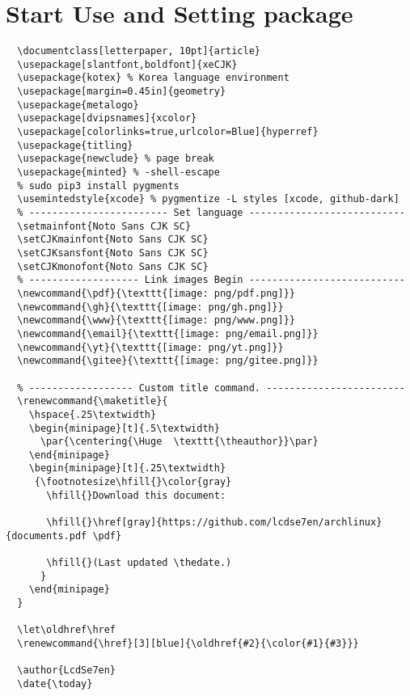 \section{Start Use and Setting package \textcolor{green}{} \textcolor{blue}{}  \textcolor{cyan}{} }


\begin{verbatim}
  \documentclass[letterpaper, 10pt]{article}
  \usepackage[slantfont,boldfont]{xeCJK}
  \usepackage{kotex} % Korea language environment
  \usepackage[margin=0.45in]{geometry}
  \usepackage{metalogo}
  \usepackage[dvipsnames]{xcolor}
  \usepackage[colorlinks=true,urlcolor=Blue]{hyperref}
  \usepackage{titling}
  \usepackage{newclude} % page break
  \usepackage{minted} % -shell-escape
  % sudo pip3 install pygments
  \usemintedstyle{xcode} % pygmentize -L styles [xcode, github-dark]
  % ------------------------ Set language ---------------------------
  \setmainfont{Noto Sans CJK SC}
  \setCJKmainfont{Noto Sans CJK SC}
  \setCJKsansfont{Noto Sans CJK SC}
  \setCJKmonofont{Noto Sans CJK SC}
  % ------------------- Link images Begin ---------------------------
  \newcommand{\pdf}{\texttt{[image: png/pdf.png]}}
  \newcommand{\gh}{\texttt{[image: png/gh.png]}}
  \newcommand{\www}{\texttt{[image: png/www.png]}}
  \newcommand{\email}{\texttt{[image: png/email.png]}}
  \newcommand{\yt}{\texttt{[image: png/yt.png]}}
  \newcommand{\gitee}{\texttt{[image: png/gitee.png]}}

  % ------------------ Custom title command. ------------------------
  \renewcommand{\maketitle}{
    \hspace{.25\textwidth}
    \begin{minipage}[t]{.5\textwidth}
      \par{\centering{\Huge  \texttt{\theauthor}}\par}
    \end{minipage}
    \begin{minipage}[t]{.25\textwidth}
     {\footnotesize\hfill{}\color{gray}
       \hfill{}Download this document:

       \hfill{}\href[gray]{https://github.com/lcdse7en/archlinux}{documents.pdf \pdf}

       \hfill{}(Last updated \thedate.)
      }
    \end{minipage}
  }

  \let\oldhref\href
  \renewcommand{\href}[3][blue]{\oldhref{#2}{\color{#1}{#3}}}

  \author{LcdSe7en}
  \date{\today}
\end{verbatim}


